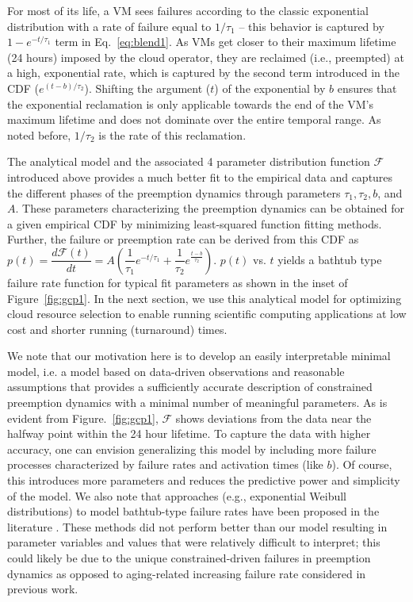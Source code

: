 For most of its life, a VM sees failures according to the classic exponential distribution with a rate of failure equal to $1/\tau_1$ -- this behavior is captured by $1-e^{-t/\tau_1}$ term in Eq.~\ref{eq:blend1}. 
As VMs get closer to their maximum lifetime (24 hours) imposed by the cloud operator, they are reclaimed (i.e., preempted) at a high, exponential rate, which is captured by the second term introduced in the CDF ($e^{(t-b)/\tau_2}$). 
Shifting the argument ($t$) of the exponential by $b$ ensures that the exponential reclamation is only applicable towards the end of the VM's maximum lifetime and does not dominate over the entire temporal range. As noted before, $1/\tau_2$ is the rate of this reclamation. 

The analytical model and the associated 4 parameter distribution function $\mathscr{F}$ introduced above provides a much better fit to the empirical data and captures the different phases of the preemption dynamics through parameters $\tau_1, \tau_2, b$, and $A$. These parameters characterizing the preemption dynamics can be obtained for a given empirical CDF by minimizing least-squared function fitting methods.\footnotemark 
%
%
Further, the failure or preemption rate can be derived from this CDF as $p(t) = \dfrac{d \mathscr{F}(t)} {dt} = A \left(\dfrac{1}{\tau_1}e^{-t/\tau_1} + \dfrac{1}{\tau_2}e^{\frac{t-b}{\tau_2}}\right)$. $p(t)$ vs. $t$ yields a bathtub type failure rate function for typical fit parameters as shown in the inset of Figure~\ref{fig:gcp1}.
In the next section, we use this analytical model for optimizing cloud resource selection to enable running scientific computing applications at low cost and shorter running (turnaround) times.

We note that our motivation here is to develop an easily interpretable minimal model, i.e. a model based on data-driven observations and reasonable assumptions that provides a sufficiently accurate description of constrained preemption dynamics with a minimal number of meaningful parameters.
As is evident from Figure.~\ref{fig:gcp1}, $\mathscr{F}$ shows deviations from the data near the halfway point within the 24 hour lifetime. To capture the data with higher accuracy, one can envision generalizing this model by including more failure processes characterized by failure rates and activation times (like $b$). 
Of course, this introduces more parameters and reduces the predictive power and simplicity of the model. We also note that approaches (e.g., exponential Weibull distributions) to model bathtub-type failure rates have been proposed in the literature  \cite{mudholkar1993exponentiated,crevecoeur1993model}.
These methods did not perform better than our model resulting in parameter variables and values that were relatively difficult to interpret; this could likely be due to the unique constrained-driven failures in preemption dynamics as opposed to aging-related increasing failure rate considered in previous work. 



